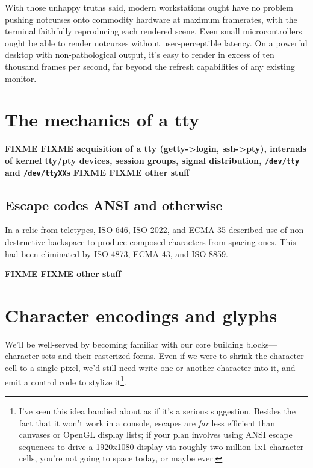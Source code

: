 \documentclass[letterpaper,10pt]{article}
\begin{document}
With those unhappy truths said, modern workstations ought have no problem pushing
notcurses onto commodity hardware at maximum framerates, with the terminal
faithfully reproducing each rendered scene. Even small microcontrollers ought
be able to render notcurses without user-perceptible latency. On a powerful
desktop with non-pathological output, it's easy to render in excess of
ten thousand frames per second, far beyond the refresh capabilities of any
existing monitor.

\newpage


\newpage

\section{The mechanics of a tty}
\label{section:tty}
\textbf{FIXME FIXME acquisition of a tty (getty->login, ssh->pty),
  internals of kernel tty/pty devices, session groups, signal distribution,
  \texttt{/dev/tty} and \texttt{/dev/ttyXX}s}
\textbf{FIXME FIXME other stuff}
\subsection{Escape codes ANSI and otherwise}
\label{sec:escapes}

In a relic from teletypes, ISO 646, ISO 2022, and ECMA-35 described use of
non-destructive backspace to produce composed characters from spacing ones.
This had been eliminated by ISO 4873, ECMA-43, and ISO 8859.

\textbf{FIXME FIXME other stuff}

\newpage

\section{Character encodings and glyphs}
\label{section:unicode}
We'll be well-served by becoming familiar with our core building
blocks---character sets and their rasterized forms. Even if we were to shrink
the character cell to a single pixel, we'd still need write one or another
character into it, and emit a control code to stylize it\footnote{I've seen
this idea bandied about as if it's a serious suggestion. Besides the fact
that it won't work in a console, escapes are \textit{far} less efficient than
canvases or OpenGL display lists; if your plan involves using ANSI escape
sequences to drive a 1920x1080 display via roughly two million 1x1 character
cells, you're not going to space today, or maybe ever\cite{upgoerfive}.}.
\end{document}
